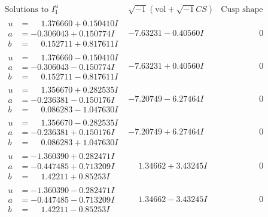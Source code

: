 \documentclass[1p]{elsarticle_modified}
\theoremstyle{definition}
\newcommand{\I}{\sqrt{-1}}
\begin{document}
$$\begin{array}{c|c|c}
 \end{array}$$\newpage$$\begin{array}{c|c|c}  
\text{Solutions to }I^u_{1}& \I (\text{vol} + \sqrt{-1}CS) & \text{Cusp shape}\\
 \hline 
\begin{aligned}
u &= \phantom{-}1.376660 + 0.150410 I \\
a &= -0.306043 + 0.150774 I \\
b &= \phantom{-}0.152711 + 0.817611 I\end{aligned}
 & -7.63231 - 0.40560 I & \phantom{-0.000000 } 0 \\ \hline\begin{aligned}
u &= \phantom{-}1.376660 - 0.150410 I \\
a &= -0.306043 - 0.150774 I \\
b &= \phantom{-}0.152711 - 0.817611 I\end{aligned}
 & -7.63231 + 0.40560 I & \phantom{-0.000000 } 0 \\ \hline\begin{aligned}
u &= \phantom{-}1.356670 + 0.282535 I \\
a &= -0.236381 - 0.150176 I \\
b &= \phantom{-}0.086283 - 1.047630 I\end{aligned}
 & -7.20749 - 6.27464 I & \phantom{-0.000000 } 0 \\ \hline\begin{aligned}
u &= \phantom{-}1.356670 - 0.282535 I \\
a &= -0.236381 + 0.150176 I \\
b &= \phantom{-}0.086283 + 1.047630 I\end{aligned}
 & -7.20749 + 6.27464 I & \phantom{-0.000000 } 0 \\ \hline\begin{aligned}
u &= -1.360390 + 0.282471 I \\
a &= -0.447485 + 0.713209 I \\
b &= \phantom{-}1.42211 + 0.85253 I\end{aligned}
 & \phantom{-}1.34662 + 3.43245 I & \phantom{-0.000000 } 0 \\ \hline\begin{aligned}
u &= -1.360390 - 0.282471 I \\
a &= -0.447485 - 0.713209 I \\
b &= \phantom{-}1.42211 - 0.85253 I\end{aligned}
 & \phantom{-}1.34662 - 3.43245 I & \phantom{-0.000000 } 0 \\ \hline\begin{aligned}

\end{aligned}
\end{array}$$
\end{document}

